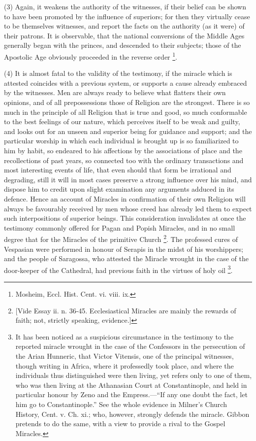 (3) Again, it weakens the authority of the
witnesses, if their belief can be shown to have been promoted by the
influence of superiors; for then they virtually cease to be themselves
witnesses, and report the facts on the authority (as it were) of their
patrons. It is observable, that the national conversions of the Middle
Ages generally began with the princes, and descended to their
subjects; those of the Apostolic Age obviously proceeded in the
reverse order \footnote{Mosheim, Eccl. Hist. Cent. vi. viii. ix.}.

(4) It is almost fatal to the validity of the
testimony, if the miracle which is attested coincides with a previous
system, or supports a cause already embraced by the witnesses. Men are
always ready to believe what flatters their own opinions, and of all
prepossessions those of Religion are the strongest. There is so much
in the principle of all Religion that is true and good, so much
conformable to the best feelings of our nature, which perceives itself
to be weak and guilty, and looks out for an unseen and superior being
for guidance and support; and the particular worship in which each
individual is brought up is so familiarized to him by habit, so
endeared to his affections by the associations of place and the
recollections of past years, so connected too with the ordinary
transactions and most interesting events of life, that even should
that form be irrational and degrading, still it will in most cases
preserve a strong influence over his mind, and dispose him to
credit upon slight examination any arguments adduced in its defence.
Hence an account of Miracles in confirmation of their own Religion
will always be favourably received by men whose creed has already led
them to expect such interpositions of superior beings. This
consideration invalidates at once the testimony commonly offered for
Pagan and Popish Miracles, and in no small degree that for the
Miracles of the primitive Church \footnote{[Vide Essay ii. n. 36-45. Ecclesiastical Miracles are mainly the
rewards of faith; not, strictly speaking, evidence.]}. The professed cures of Vespasian were performed in honour of
Serapis in the midst of his worshippers; and the people of Saragossa,
who attested the Miracle wrought in the case of the door-keeper of the
Cathedral, had previous faith in the virtues of holy oil \footnote{It has been noticed as a suspicious circumstance in the testimony to
the reported miracle wrought in the case of the Confessors in the
persecution of the Arian Hunneric, that Victor Vitensis, one of the
principal witnesses, though writing in Africa, where it professedly
took place, and where the individuals thus distinguished were then
living, yet refers only to one of them, who was then living at the
Athanasian Court at Constantinople, and held in particular honour by
Zeno and the Empress.—``If any one doubt the fact, let him go to
Constantinople.'' See the whole evidence in Milner's Church History,
Cent. v. Ch. xi.; who, however, strongly defends the miracle. Gibbon
pretends to do the same, with a view to provide a rival to the Gospel
Miracles.}.

